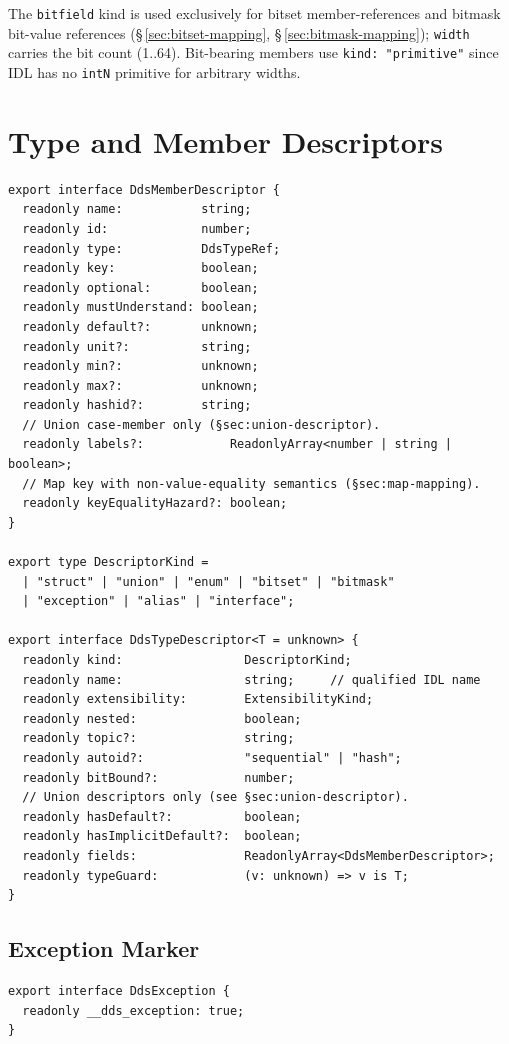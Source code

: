 \documentclass{../styles/zerodds-vendor-spec}
\begin{document}
The \texttt{bitfield} kind is used exclusively for bitset
member-references and bitmask bit-value references
(\S\,\ref{sec:bitset-mapping}, \S\,\ref{sec:bitmask-mapping});
\texttt{width} carries the bit count (1..64). Bit-bearing
members  use \texttt{kind:\,"primitive"} since
IDL has no \texttt{intN} primitive for arbitrary widths.

\section{Type and Member Descriptors}

\begin{lstlisting}
export interface DdsMemberDescriptor {
  readonly name:           string;
  readonly id:             number;
  readonly type:           DdsTypeRef;
  readonly key:            boolean;
  readonly optional:       boolean;
  readonly mustUnderstand: boolean;
  readonly default?:       unknown;
  readonly unit?:          string;
  readonly min?:           unknown;
  readonly max?:           unknown;
  readonly hashid?:        string;
  // Union case-member only (§sec:union-descriptor).
  readonly labels?:            ReadonlyArray<number | string | boolean>;
  // Map key with non-value-equality semantics (§sec:map-mapping).
  readonly keyEqualityHazard?: boolean;
}

export type DescriptorKind =
  | "struct" | "union" | "enum" | "bitset" | "bitmask"
  | "exception" | "alias" | "interface";

export interface DdsTypeDescriptor<T = unknown> {
  readonly kind:                 DescriptorKind;
  readonly name:                 string;     // qualified IDL name
  readonly extensibility:        ExtensibilityKind;
  readonly nested:               boolean;
  readonly topic?:               string;
  readonly autoid?:              "sequential" | "hash";
  readonly bitBound?:            number;
  // Union descriptors only (see §sec:union-descriptor).
  readonly hasDefault?:          boolean;
  readonly hasImplicitDefault?:  boolean;
  readonly fields:               ReadonlyArray<DdsMemberDescriptor>;
  readonly typeGuard:            (v: unknown) => v is T;
}
\end{lstlisting}

\subsection*{Exception Marker}

\begin{lstlisting}
export interface DdsException {
  readonly __dds_exception: true;
}
\end{lstlisting}
\end{document}
